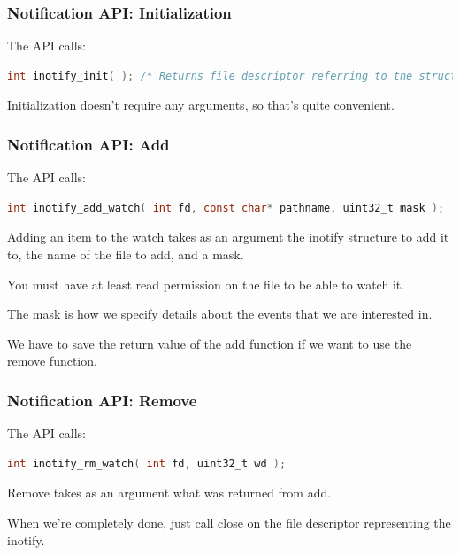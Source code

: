 \begin{frame}[fragile]
\frametitle{Notification API: Initialization}

The API calls:
\begin{lstlisting}[language=C]
int inotify_init( ); /* Returns file descriptor referring to the struct */
\end{lstlisting}

Initialization doesn't require any arguments, so that's quite convenient.

\end{frame}

\begin{frame}[fragile]
\frametitle{Notification API: Add}

The API calls:
\begin{lstlisting}[language=C]
int inotify_add_watch( int fd, const char* pathname, uint32_t mask );
\end{lstlisting}


Adding an item to the watch takes as an argument the inotify structure to add it to, the name of the file to add, and a mask. 

You must have at least read permission on the file to be able to watch it. 

The mask is how we specify details about the events that we are interested in.

We have to save the return value of the add function if we want to use the remove function.

\end{frame}

\begin{frame}[fragile]
\frametitle{Notification API: Remove}

The API calls:
\begin{lstlisting}[language=C]
int inotify_rm_watch( int fd, uint32_t wd );
\end{lstlisting}

Remove takes as an argument what was returned from add.

When we're completely done, just call close on the file descriptor representing the inotify.

\end{frame}


